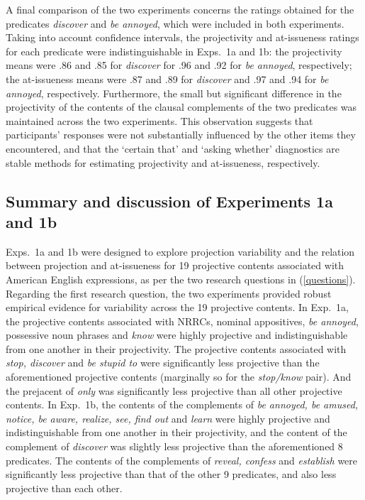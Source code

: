 \documentclass[11pt,fleqn]{article}
\newcommand{\6}{\mbox{$[\hspace*{-.6mm}[$}}
\newcommand{\9}{\mbox{$]\hspace*{-.6mm}]$}}
\begin{document}
A final comparison of the two experiments concerns the ratings obtained for the predicates {\em discover} and {\em be annoyed}, which were included in both experiments. Taking into account confidence intervals, the projectivity and at-issueness ratings for each predicate were indistinguishable in Exps.~1a and 1b: the projectivity means were .86 and .85 for {\em discover} for .96 and .92 for \emph{be annoyed}, respectively; the at-issueness means were .87 and .89 for \emph{discover} and .97 and .94 for \emph{be annoyed}, respectively. Furthermore, the small but significant difference in the projectivity of the contents of the clausal complements of the two predicates was maintained across the two experiments. This observation suggests that participants' responses were not substantially influenced by the other items they encountered, and that the `certain that' and `asking whether' diagnostics are stable methods for estimating projectivity and at-issueness, respectively.

\subsection{Summary and discussion of Experiments 1a and 1b}\label{s-summary1a1b}

Exps.~1a and 1b were designed to explore projection variability and the relation between projection and at-issueness for 19 projective contents associated with American English expressions, as per the two research questions in (\ref{questions}). Regarding the first research question, the two experiments provided robust empirical evidence for variability across the 19 projective contents. In Exp.~1a, the projective contents associated with NRRCs, nominal appositives, {\em be annoyed}, possessive noun phrases and {\em know} were highly projective and indistinguishable from one another in their projectivity. The projective contents associated with {\em stop, discover} and {\em be stupid to} were significantly less projective than the aforementioned projective contents (marginally so for the {\em stop/know} pair). And the prejacent of {\em only} was significantly less projective than all other projective contents. In Exp.~1b, the contents of the complements of {\em be annoyed, be amused, notice, be aware, realize, see, find out} and {\em learn} were highly projective and indistinguishable from one another in their projectivity, and the content of the complement of {\em discover} was slightly less projective than the aforementioned 8 predicates. The contents of the complements of {\em reveal, confess} and {\em establish} were significantly less projective than that of the other 9 predicates, and also less projective than each other.
\end{document}
